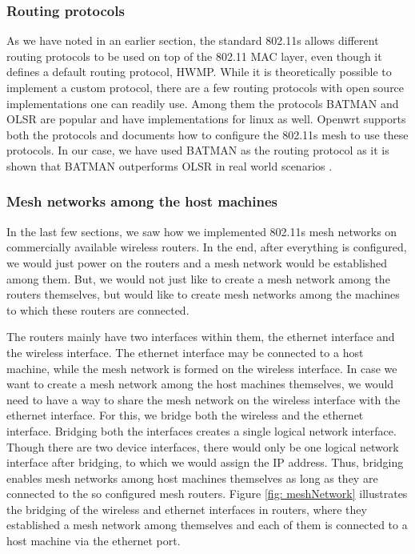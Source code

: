 \subsubsection{Routing protocols}
As we have noted in an earlier section, the standard 802.11s allows different routing protocols to be used on top of the 802.11 MAC layer, even though it defines a default routing protocol, HWMP. While it is theoretically possible to implement a custom protocol, there are a few routing protocols with open source implementations one can readily use. Among them the protocols BATMAN and OLSR are popular and have implementations for linux as well. Openwrt supports both the protocols and documents how to configure the 802.11s mesh to use these protocols. In our case, we have used BATMAN as the routing protocol as it is shown that BATMAN outperforms OLSR in real world scenarios \cite{batcom}.

\subsubsection{Mesh networks among the host machines}
In the last few sections, we saw how we implemented 802.11s mesh networks on commercially available wireless routers. In the end, after everything is configured, we would just power on the routers and a mesh network would be established among them. But, we would not just like to create a mesh network among the routers themselves, but would like to create mesh networks among the machines to which these routers are connected.

The routers mainly have two interfaces within them, the ethernet interface and the wireless interface. The ethernet interface may be connected to a host machine, while the mesh network is formed on the wireless interface. In case we want to create a mesh network among the host machines themselves, we would need to have a way to share the mesh network on the wireless interface with the ethernet interface. For this, we bridge both the wireless and the ethernet interface. Bridging both the interfaces creates a single logical network interface. Though there are two device interfaces, there would only be one logical network interface after bridging, to which we would assign the IP address. Thus, bridging enables mesh networks among host machines themselves as long as they are connected to the so configured mesh routers. Figure \ref{fig: meshNetwork} illustrates the bridging of the wireless and ethernet interfaces in routers, where they established a mesh network among themselves and each of them is connected to a host machine via the ethernet port.

